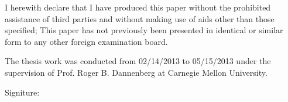 

\begin{declaration}        %

I herewith declare that I have produced this paper without the prohibited 
assistance of third parties and without making use of aids other than those specified; 
This paper has not previously been presented in identical or similar form to any 
other foreign examination board.

The thesis work was conducted from 02/14/2013 to 05/15/2013 under the supervision 
of Prof. Roger B. Dannenberg at Carnegie Mellon University.

\vspace{10mm}
Signiture: 

\end{declaration}


